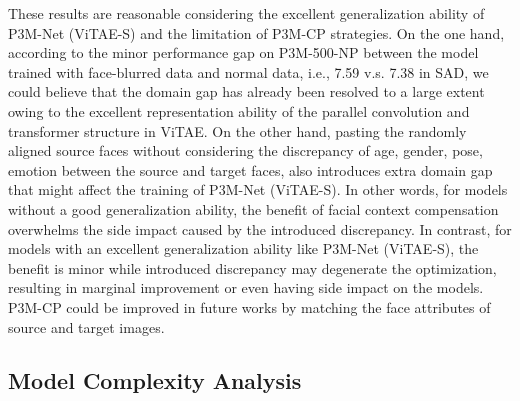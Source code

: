 \documentclass[twocolumn]{svjour3}
\begin{document}
These results are reasonable considering the excellent generalization ability of P3M-Net (ViTAE-S) and the limitation of P3M-CP strategies. On the one hand, according to the minor performance gap on P3M-500-NP between the model trained with face-blurred data and normal data, i.e., 7.59 v.s. 7.38 in SAD, we could believe that the domain gap has already been resolved to a large extent owing to the excellent representation ability of the parallel convolution and transformer structure in ViTAE. On the other hand, pasting the randomly aligned source faces without considering the discrepancy of age, gender, pose, emotion between the source and target faces, also introduces extra domain gap that might affect the training of P3M-Net (ViTAE-S). In other words, for models without a good generalization ability, the benefit of facial context compensation overwhelms the side impact caused by the introduced discrepancy. In contrast, for models with an excellent generalization ability like P3M-Net (ViTAE-S), the benefit is minor while introduced discrepancy may degenerate the optimization, resulting in marginal improvement or even having side impact on the models. P3M-CP could be improved in future works by matching the face attributes of source and target images.



\subsection{Model Complexity Analysis}

\begin{table}[htb]
\begin{center}
\end{center}
\caption{Model complexity and inference speed comparison. In inference speed test, the input size is 512 $\times$ 512, and the inference time is averaged over 100 trials. P3M(R), P3M(S), and
P3M(V) stand for the P3M-Net variants based on ResNet-34, Swin-T, and ViTAE-S backbones, respectively.}
\label{tab:model_complexity_and_speed_sota}
\end{table}
\end{document}
